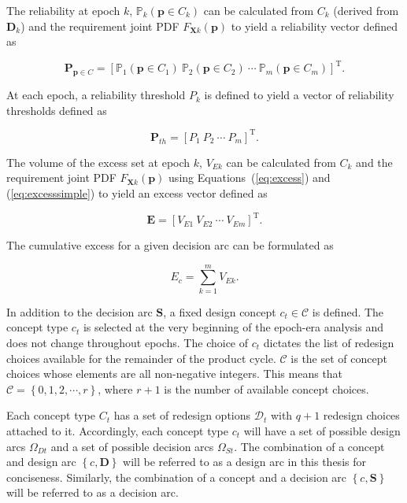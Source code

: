 The reliability at epoch $k$, $\mathbb{P}_k(\mathbf{p} \in C_k)$ can be calculated from $C_k$ (derived from $\mathbf{D}_k$) and the requirement joint \ac{PDF} $F_{\mathbf{X}k}(\mathbf{p})$ to yield a reliability vector defined as

\begin{equation} \label{eq:reliabilityvector}
	\mathbf{P}_{\mathbf{p} \in {C}} = \left[\mathbb{P}_1(\mathbf{p} \in C_1) ~ \mathbb{P}_2(\mathbf{p} \in C_2) ~ \cdots ~ \mathbb{P}_m(\mathbf{p} \in C_m)\right]^{\mathrm{T}}.
\end{equation}

At each epoch, a reliability threshold $P_k$ is defined to yield a vector of reliability thresholds defined as

\begin{equation} \label{eq:reliabilitythvector}
	\mathbf{P}_{th} = \left[P_1 ~ P_2 ~ \cdots ~ P_m\right]^{\mathrm{T}}.
\end{equation}

The volume of the excess set at epoch $k$, $V_{Ek}$ can be calculated from $C_k$ and the requirement joint \ac{PDF} $F_{\mathbf{X}k}(\mathbf{p})$ using Equations~(\ref{eq:excess}) and (\ref{eq:excesssimple}) to yield an excess vector defined as

\begin{equation} \label{eq:excessvector}
	\mathbf{E} = \left[V_{E1} ~ V_{E2} ~ \cdots ~ V_{Em}\right]^{\mathrm{T}}.
\end{equation}

The cumulative excess for a given decision arc can be formulated as

\begin{equation} \label{eq:excesscumulative}
	E_c = \sum\limits_{k=1}^{m} V_{Ek}.
\end{equation}

In addition to the decision arc $\mathbf{S}$, a fixed design concept $c_t\in\mathcal{C}$ is defined. The concept type $c_t$ is selected at the very beginning of the epoch-era analysis and does not change throughout epochs. The choice of $c_t$ dictates the list of redesign choices available for the remainder of the product cycle. $\mathcal{C}$ is the set of concept choices whose elements are all non-negative integers. This means that $\mathcal{C} = \left\{0,1,2,\cdots,r\right\}$, where $r + 1$ is the number of available concept choices.

Each concept type $C_t$ has a set of redesign options $\mathcal{D}_t$ with $q+1$ redesign choices attached to it. Accordingly, each concept type $c_t$ will have a set of possible design arcs $\Omega_{Dt}$ and a set of possible decision arcs $\Omega_{St}$. The combination of a concept and design arc $\left\{c,\mathbf{D}\right\}$ will be referred to as a design arc in this thesis for conciseness. Similarly, the combination of a concept and a decision arc $\left\{c,\mathbf{S}\right\}$ will be referred to as a decision arc.

